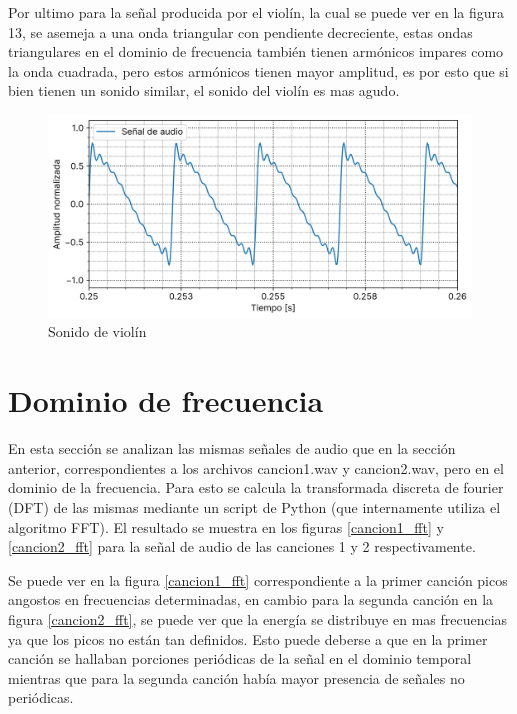\documentclass[12pt]{article}
\begin{document}
Por ultimo para la señal producida por el violín, la cual se puede ver
en la figura 13, se asemeja a una onda triangular con pendiente
decreciente, estas ondas triangulares en el dominio de frecuencia
también tienen armónicos impares como la onda cuadrada, pero estos
armónicos tienen mayor amplitud, es por esto que si bien tienen un
sonido similar, el sonido del violín es mas agudo.

\begin{figure}
\centering
\includegraphics{plot/a4_violin.png}
\caption{Sonido de violín}
\label{a4_violin}
\end{figure}









\hypertarget{Dominio-de-frecuencia}{%
\section{Dominio de frecuencia}\label{dominio-de-frecuencia}}

En esta sección se analizan las mismas señales de audio que en la
sección anterior, correspondientes a los archivos cancion1.wav y cancion2.wav, pero en el dominio de la frecuencia. Para esto se calcula la
transformada discreta de fourier (DFT) de las mismas mediante un script de
Python (que internamente utiliza el algoritmo FFT). El resultado se muestra en
los figuras \ref{cancion1_fft} y \ref{cancion2_fft} para la señal de audio de
las canciones 1 y 2 respectivamente.

Se puede ver en la figura \ref{cancion1_fft} correspondiente a la primer canción
picos angostos en frecuencias determinadas, en cambio para la segunda canción en
la figura \ref{cancion2_fft}, se puede ver que la energía se distribuye en mas
frecuencias ya que los picos no están tan definidos. Esto puede deberse a que en
la primer canción se hallaban porciones periódicas de la señal en el dominio
temporal mientras que para la segunda canción había mayor presencia de señales
no periódicas.
\end{document}
